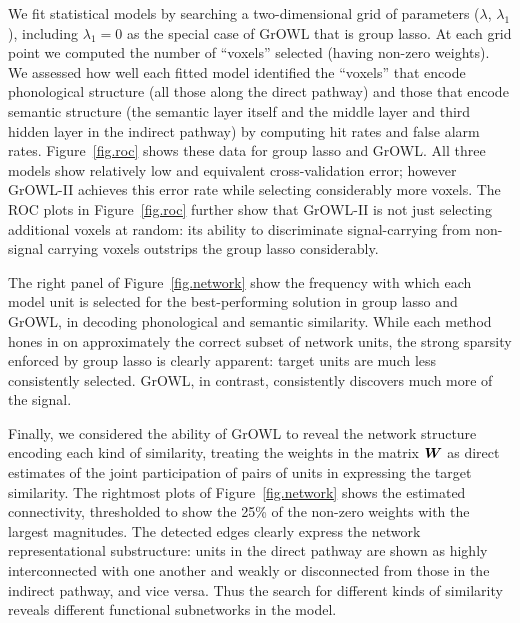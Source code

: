 We fit statistical models by searching a two-dimensional grid of parameters
($\lambda$, $\lambda_1$), including $\lambda_1=0$ as the special case of GrOWL that is
group lasso. At each grid point we computed the number of ``voxels'' selected (\ie having
non-zero weights). We assessed how well each fitted model identified the ``voxels'' that
encode phonological structure (all those along the direct pathway) and those that encode
semantic structure (the semantic layer itself and the middle layer and third hidden layer
in the indirect pathway) by computing hit rates and false alarm rates. Figure~\ref{fig.roc}
shows these data for group lasso and GrOWL. All three models show relatively low and
equivalent cross-validation error; however GrOWL-II achieves this error rate while
selecting considerably more voxels. The ROC plots in Figure~\ref{fig.roc} further show
that GrOWL-II is not just selecting additional voxels at random: its ability to
discriminate signal-carrying from non-signal carrying voxels outstrips the group lasso
considerably.

The right panel of Figure~\ref{fig.network} show the frequency with which each model unit
is selected for the best-performing solution in group lasso and GrOWL, in decoding
phonological and semantic similarity. While each method hones in on approximately the
correct subset of network units, the strong sparsity enforced by group lasso is clearly
apparent: target units are much less consistently selected. GrOWL, in contrast,
consistently discovers much more of the signal.

Finally, we considered the ability of GrOWL to reveal the network structure encoding each
kind of similarity, treating the weights in the matrix $\boldsymbol{W}$ as direct estimates of the
joint participation of pairs of units in expressing the target similarity. The rightmost
plots of Figure~\ref{fig.network} shows the estimated connectivity, thresholded to show
the 25\% of the non-zero weights with the largest magnitudes. The detected edges clearly
express the network representational substructure: units in the direct pathway are shown
as highly interconnected with one another and weakly or disconnected from those in the
indirect pathway, and vice versa. Thus the search for different kinds of similarity
reveals different functional subnetworks in the model.

